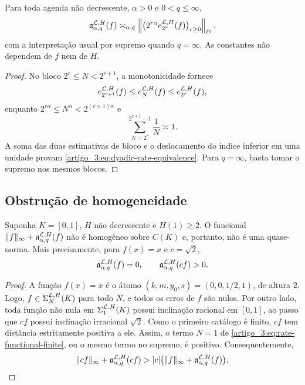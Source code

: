 \begin{theorem}\label{map:artigo_3:3.2}
\label{artigo_3:thm:dyadic-rate-equivalence}
Para toda agenda não decrescente, $\alpha>0$ e $0<q\le\infty$,
\begin{equation}
 \mathfrak a_{\alpha,q}^{\mathcal{L},H}(f)
 \asymp_{\alpha,q}
 \left\|\bigl(2^{r\alpha}
 e_{2^r}^{\mathcal{L},H}(f)\bigr)_{r\ge0}\right\|_{\ell^q},
 \label{artigo_3:eq:dyadic-rate-equivalence}
\end{equation}
com a interpretação usual por supremo quando $q=\infty$. As constantes não
dependem de $f$ nem de $H$.
\end{theorem}

\begin{proof}
No bloco $2^r\le N<2^{r+1}$, a monotonicidade fornece
\[
 e_{2^{r+1}}^{\mathcal{L},H}(f)
 \le e_N^{\mathcal{L},H}(f)
 \le e_{2^r}^{\mathcal{L},H}(f),
\]
enquanto $2^{r\alpha}\le N^\alpha<2^{(r+1)\alpha}$ e
\[
 \sum_{N=2^r}^{2^{r+1}-1}\frac1N\asymp1.
\]
A soma das duas estimativas de bloco e o deslocamento do índice inferior em uma
unidade provam \eqref{artigo_3:eq:dyadic-rate-equivalence}. Para $q=\infty$, basta
tomar o supremo nos mesmos blocos.
\end{proof}

\subsection{Obstrução de homogeneidade}

\begin{proposition}\label{map:artigo_3:3.3}
\label{artigo_3:prop:nonhomogeneous-functional}
Suponha $K=[0,1]$, $H$ não decrescente e $H(1)\ge2$. O funcional
$\|f\|_\infty+\mathfrak a_{\alpha,q}^{\mathcal{L},H}(f)$ não é homogêneo sobre
$C(K)$ e, portanto, não é uma quase-norma. Mais precisamente, para
$f(x)=x$ e $c=\sqrt2$,
\begin{equation}
 \mathfrak a_{\alpha,q}^{\mathcal{L},H}(f)=0,
 \qquad
 \mathfrak a_{\alpha,q}^{\mathcal{L},H}(cf)>0.
 \label{artigo_3:eq:nonhomogeneous-certificate}
\end{equation}
\end{proposition}

\begin{proof}
A função $f(x)=x$ é o átomo $(k,m,y_0,s)=(0,0,1/2,1)$, de altura $2$.
Logo, $f\in\Sigma_N^{\mathcal{L},H}(K)$ para todo $N$, e todos os erros de
$f$ são nulos. Por outro lado, toda função não nula em
$\Sigma_1^{\mathcal{L},H}(K)$ possui inclinação racional em $[0,1]$, ao passo que
$cf$ possui inclinação irracional $\sqrt2$. Como o primeiro catálogo é
finito, $cf$ tem distância estritamente positiva a ele. Assim, o termo
$N=1$ de \eqref{artigo_3:eq:rate-functional-finite}, ou o mesmo termo no supremo,
é positivo. Consequentemente,
\[
 \|cf\|_\infty+\mathfrak a_{\alpha,q}^{\mathcal{L},H}(cf)
 >|c|\bigl(\|f\|_\infty+
 \mathfrak a_{\alpha,q}^{\mathcal{L},H}(f)\bigr).
\]
\end{proof}

